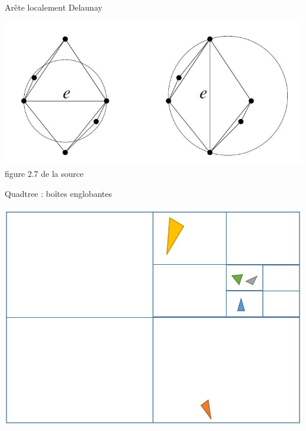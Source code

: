 \documentclass[aspectratio=169, 12pt, a4paper, hyperref={pdfauthor={Alexandre MARIN}, pdfkeywords={IFPEN, Delaunay, Voronoi, mesh generation}, colorlinks=true, linkcolor=purple, urlcolor=blue, citecolor=magenta}]{beamer}
\begin{document}
\begin{Energie}{Arête localement Delaunay}
\begin{center}
\includegraphics[scale=0.6]{locDel.jpg}
\\figure 2.7 de la source \cite{delnotes}
\end{center}
\end{Energie}

\begin{Energie}{Quadtree : boîtes englobantes}
\begin{center}
\includegraphics[scale=0.5]{boundingBoxes.jpg}
\end{center}
\end{Energie}
\end{document}
